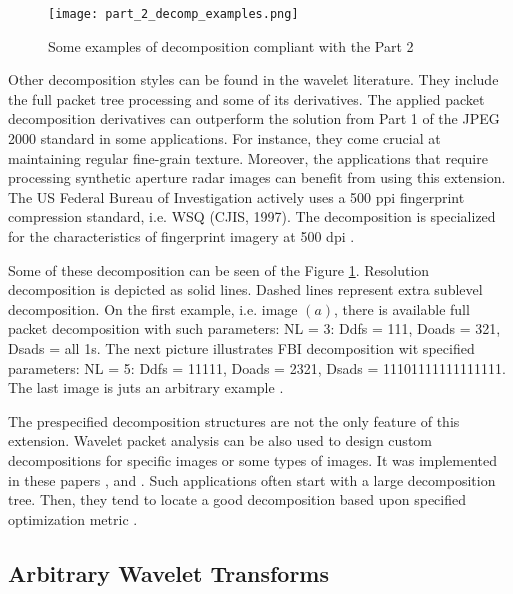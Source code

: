 \begin{figure}
    \centering
    \texttt{[image: part\_2\_decomp\_examples.png]}
    \caption{Some examples of decomposition compliant with the Part 2 \cite{jpeg_suite}}
    \label{fig:part_2_decomp_examples}
\end{figure}

Other decomposition styles can be found in the wavelet literature. They include the full packet
tree processing and some of its derivatives. The applied packet decomposition derivatives
can outperform the solution from Part 1 of the JPEG 2000 standard in some applications.
For instance, they come crucial at maintaining regular fine-grain texture. Moreover,
the applications that require processing synthetic aperture radar images can benefit
from using this extension. The US Federal Bureau of Investigation actively uses a 500 ppi
fingerprint compression standard, i.e. WSQ (CJIS, 1997). The decomposition is specialized
for the characteristics of fingerprint imagery at 500 dpi \cite{jpeg_suite}.

Some of these decomposition can be seen of the Figure \ref{fig:part_2_decomp_examples}.
Resolution decomposition is depicted as solid lines. Dashed lines represent extra sublevel
decomposition. On the first example, i.e. image $(a)$, there is available full packet decomposition
with such parameters: NL = 3: Ddfs = 111, Doads = 321, Dsads = all 1s. The next picture
illustrates FBI decomposition wit specified parameters: NL = 5: Ddfs = 11111, Doads = 2321,
Dsads = 11101111111111111. The last image is juts an arbitrary example \cite{jpeg_suite}.

The prespecified decomposition structures are not the only feature of this extension.
Wavelet packet analysis can be also used to design custom decompositions for specific images
or some types of images. It was implemented in these papers \cite{entropy_algos},
\cite{wavelet_packet} and \cite{adaptive_wavelet}. Such applications often start with
a large decomposition tree. Then, they tend to locate a good decomposition based upon
specified optimization metric \cite{jpeg_suite}.

\subsection{Arbitrary Wavelet Transforms} \label{sec:arbitrary_wavelet_transform}

